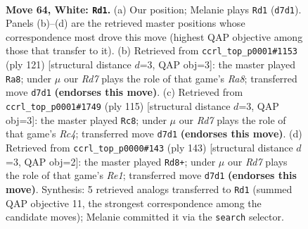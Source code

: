 \documentclass[11pt]{article}
\begin{document}
\clearpage

\begin{figure}[p]\centering
\begin{subfigure}{0.46\textwidth}\centering
\resizebox{\linewidth}{!}{%
\newchessgame
\chessboard[
  setfen={5r1k/3R4/P7/8/8/6K1/8/8 w - - 13 64},
  showmover=false,
  pgfstyle=straightmove, color=movearrow, markmove={d7-d1}
]}
\caption{}
\end{subfigure}\hfill
\begin{subfigure}{0.46\textwidth}\centering
\resizebox{\linewidth}{!}{%
\newchessgame
\chessboard[
  setfen={8/8/7p/3k4/6P1/8/4R1K1/r7 b - - 8 61},
  showmover=false,
  pgfstyle=straightmove, color=movearrow, markmove={a1-a8}
]}
\caption{}
\end{subfigure}
\\[4pt]
\begin{subfigure}{0.46\textwidth}\centering
\resizebox{\linewidth}{!}{%
\newchessgame
\chessboard[
  setfen={8/7p/4k2P/2r5/3R1K2/8/8/8 b - - 7 58},
  showmover=false,
  pgfstyle=straightmove, color=movearrow, markmove={c5-c8}
]}
\caption{}
\end{subfigure}\hfill
\begin{subfigure}{0.46\textwidth}\centering
\resizebox{\linewidth}{!}{%
\newchessgame
\chessboard[
  setfen={4r3/8/5k2/8/8/8/1R1K4/8 b - - 14 72},
  showmover=false,
  pgfstyle=straightmove, color=movearrow, markmove={e8-d8}
]}
\caption{}
\end{subfigure}
\caption{\textbf{Move 64, White: \texttt{Rd1}.} (a) Our position; Melanie plays \texttt{Rd1} (\texttt{d7d1}). Panels (b)--(d) are the retrieved master positions whose correspondence most drove this move (highest QAP objective among those that transfer to it). (b) Retrieved from \texttt{ccrl\_top\_p0001\#1153} (ply 121) [structural distance $d$=3, QAP obj=3]: the master played \texttt{Ra8}; under $\mu$ our \emph{Rd7} plays the role of that game's \emph{Ra8}; transferred move \texttt{d7d1} \textbf{(endorses this move)}. (c) Retrieved from \texttt{ccrl\_top\_p0001\#1749} (ply 115) [structural distance $d$=3, QAP obj=3]: the master played \texttt{Rc8}; under $\mu$ our \emph{Rd7} plays the role of that game's \emph{Rc4}; transferred move \texttt{d7d1} \textbf{(endorses this move)}. (d) Retrieved from \texttt{ccrl\_top\_p0000\#143} (ply 143) [structural distance $d$=3, QAP obj=2]: the master played \texttt{Rd8+}; under $\mu$ our \emph{Rd7} plays the role of that game's \emph{Re1}; transferred move \texttt{d7d1} \textbf{(endorses this move)}. Synthesis: 5 retrieved analogs transferred to \texttt{Rd1} (summed QAP objective 11, the strongest correspondence among the candidate moves); Melanie committed it via the \texttt{search} selector.}
\label{fig:thought-m126}
\end{figure}
\end{document}
